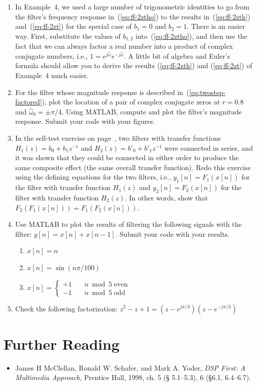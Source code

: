 \begin{enumerate}
\item In Example~4, we used a large number of trigonometric identities
  to go from the filter's frequency response in~(\ref{eq:ff-2ztho}) to
  the results in~(\ref{eq:ff-2zth}) and~(\ref{eq:ff-2zt}) for the
  special case of $b_1=0$ and $b_2=1$. There is an easier way. First,
  substitute the values of $b_{1,2}$ into~(\ref{eq:ff-2ztho}), and then
  use the fact that we can always factor a real number into a product of
  complex conjugate numbers, i.e., $1 = e^{j\hat{\omega}}
  e^{-j\hat{\omega}}$. A little bit of algebra and Euler's formula
  should allow you to derive the results (\ref{eq:ff-2zth}) and
  (\ref{eq:ff-2zt}) of Example~4 much easier.
\item For the filter whose magnitude response is described
  in~(\ref{eq:twostep-factored}), plot the location of a pair of complex
  conjugate zeros at $r=0.8$ and $\hat{\omega}_0=\pm\pi/4$. Using MATLAB,
  compute and plot the filter's magnitude response. Submit your code
  with your figures.
\item In the self-test exercise on page~\pageref{sc:ste-oper}, two
  filters with transfer functions $H_1(z) = b_0 + b_1z^{-1}$ and
  $H_2(z) = b'_0 + b'_1z^{-1}$ were connected in series, and it was
  shown that they could be connected in either order to produce the same
  composite effect (the same overall transfer function). Redo this
  exercise using the defining equations for the two filters, i.e.,
  $y_1[n] = F_1(x[n])$ for the filter with transfer function $H_1(z)$
  and $y_2[n] = F_2(x[n])$ for the filter with transfer function
  $H_2(z)$. In other words, show that $F_2(F_1(x[n])) =
  F_1(F_2(x[n]))$.
\item Use MATLAB to plot the results of filtering the following
  signals with the filter: $y[n] = x[n] + x[n-1]$.  Submit your code
  with your results.
  \begin{enumerate}
  \item $x[n] = n$
  \item $x[n] = \sin(n\pi/100)$
  \item $\displaystyle
    x[n] = \left\{\begin{array}{ll}+1 & \quad n \bmod 5 \;\mathrm{even}\\
        -1 & \quad n \bmod 5 \;\mathrm{odd}\end{array}\right. $
  \end{enumerate}
\item Check the following factorization: $z^2 - z + 1 = (z -
  e^{j\pi/3}) (z - e^{-j\pi/3})$
\end{enumerate}

\section{Further Reading}

\begin{itemize}
\item James H McClellan, Ronald W. Schafer, and Mark A. Yoder, \textit{DSP
  First: A Multimedia Approach}, Prentice Hall, 1998, ch. 5 (\S
5.1--5.3), 6 (\S 6.1, 6.4--6.7).
\end{itemize}


